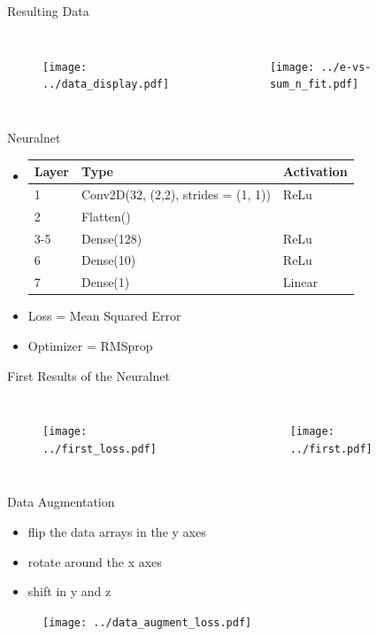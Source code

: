 \documentclass[10pt]{beamer}
\begin{document}
\begin{frame}{Resulting Data}
  \begin{columns}
    \begin{figure}[htp]
      \texttt{[image: ../data\_display.pdf]}
    \end{figure}
    \begin{figure}[htp]
      \texttt{[image: ../e-vs-sum\_n\_fit.pdf]}
    \end{figure}
  \end{columns}
\end{frame}

\begin{frame}{Neuralnet}
  \begin{itemize}
  \item 
    \begin{tabular}{l|l|l}
      Layer & Type                                & Activation \\ \hline
      1     & Conv2D(32, (2,2), strides = (1, 1)) & ReLu       \\
      2     & Flatten()                           &            \\
      3-5   & Dense(128)                          & ReLu       \\
      6     & Dense(10)                           & ReLu       \\
      7     & Dense(1)                            & Linear    
    \end{tabular}
  \item Loss = Mean Squared Error
  \item Optimizer = RMSprop
  \end{itemize}
\end{frame}

\begin{frame}{First Results of the Neuralnet}
  \begin{columns}
    \begin{figure}[htp]
      \texttt{[image: ../first\_loss.pdf]}
    \end{figure}
    \begin{figure}[htp]
      \texttt{[image: ../first.pdf]}
    \end{figure}
  \end{columns}
\end{frame}

\begin{frame}{Data Augmentation}
  \begin{itemize}
  \item flip the data arrays in the y axes
  \item rotate around the x axes
  \item shift in y and z
  \end{itemize}
    \begin{figure}[htp]
      \texttt{[image: ../data\_augment\_loss.pdf]}
    \end{figure}
\end{frame}
\end{document}
